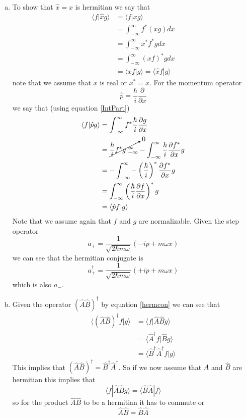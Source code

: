 \documentclass[11pt]{article}
\numberwithin{equation}{section}
\newcommand{\norm}[2]{\langle{#1}|{#2}\rangle}
\begin{document}
\begin{enumerate}[(a)]
\item
To show that $\hat{x} = x$ is hermitian we say that
\begin{align*}
\norm{f}{\hat{x}g} &= \norm{f}{xg}\\ 
&= \int_{-\infty}^{\infty}f^*(xg)dx\\
&= \int_{-\infty}^{\infty}x^*f^*gdx\\
&= \int_{-\infty}^{\infty}(xf)^*gdx\\
&= \norm{xf}{g} = \norm{\hat{x}f}{g}
\end{align*}
note that we assume that $x$ is real or $x^* = x$. For the momentum operator 
$$\hat{p} = \frac{\hbar}{i}\frac{\partial}{\partial x}$$
we say that (using equation \ref{IntPart})
\begin{align*}
\norm{f}{\hat{p}g} &= \int_{-\infty}^{\infty}f^*\frac{\hbar}{i}\frac{\partial g}{\partial x}\\
&= \cancelto{0}{\frac{\hbar}{i}f^*g|_{-\infty}^{\infty}} - \int_{-\infty}^{\infty}\frac{\hbar}{i}\frac{\partial f^*}{\partial x}g\\
&= - \int_{-\infty}^{\infty}-\left(\frac{\hbar}{i}\right)^*\frac{\partial f^*}{\partial x}g\\
&= \int_{-\infty}^{\infty}\left(\frac{\hbar}{i}\frac{\partial f}{\partial x}\right)^*g\\
&= \norm{\hat{p}f}{g}
\end{align*}
Note that we assume again that $f$ and $g$ are normalizable. Given the step operator 
$$a_+ = \frac{1}{\sqrt{2\hbar m\omega}}(-ip+m\omega x)$$
we can see that the hermitian conjugate is 
$$a_+^{\dagger} = \frac{1}{\sqrt{2\hbar m\omega}}(+ip+m\omega x)$$
which is also $a_-$.

\item
Given the operator $(\hat{A}\hat{B})^{\dagger}$ by equation \ref{hermcon} we can see that
\begin{align*}
\norm{(\hat{A}\hat{B})^{\dagger}f}{g} &= \norm{f}{\hat{A}\hat{B}g}\\
&= \norm{\hat{A}^{\dagger}f}{\hat{B}g}\\
&= \norm{\hat{B}^{\dagger}\hat{A}^{\dagger}f}{g}
\end{align*}
This implies that $(\hat{A}\hat{B})^{\dagger} = \hat{B}^{\dagger}\hat{A}^{\dagger}$. So if we now assume that $\hat{A}$ and $\hat{B}$ are hermitian this implies that
$$\norm{f}{\hat{A}\hat{B}g} = \norm{\hat{B}\hat{A}}{f}$$
so for the product $\hat{A}\hat{B}$ to be a hermitian it has to commute or
$$\hat{A}\hat{B} = \hat{B}\hat{A}$$

\end{enumerate}
\end{document}
